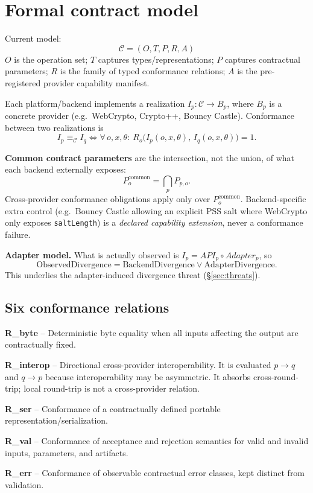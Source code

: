 \documentclass[11pt,a4paper]{article}
\begin{document}
\section{Formal contract model}
Current model:
\[\mathcal{C}=(O,T,P,R,A)\]
$O$ is the operation set; $T$ captures types/representations; $P$ captures contractual parameters; $R$ is the family of typed conformance relations; $A$ is the pre-registered provider capability manifest.

Each platform/backend implements a realization $I_p:\mathcal{C}\to B_p$, where $B_p$ is a concrete provider (e.g.\ WebCrypto, Crypto++, Bouncy Castle). Conformance between two realizations is
\[I_p\equiv_{\mathcal{C}} I_q \iff \forall\, o,x,\theta:\ R_o\big(I_p(o,x,\theta),\,I_q(o,x,\theta)\big)=1.\]

\textbf{Common contract parameters} are the intersection, not the union, of what each backend externally exposes:
\[P_o^{\text{common}} = \bigcap_p P_{p,o}.\]
Cross-provider conformance obligations apply only over $P_o^{\text{common}}$. Backend-specific extra control (e.g.\ Bouncy Castle allowing an explicit PSS salt where WebCrypto only exposes \texttt{saltLength}) is a \emph{declared capability extension}, never a conformance failure.

\textbf{Adapter model.} What is actually observed is $I_p = API_p \circ Adapter_p$, so
\[\text{ObservedDivergence} = \text{BackendDivergence} \lor \text{AdapterDivergence}.\]
This underlies the adapter-induced divergence threat (\S\ref{sec:threats}).

\subsection{Six conformance relations}
\textbf{R\_byte} -- Deterministic byte equality when all inputs affecting the output are contractually fixed.

\textbf{R\_interop} -- Directional cross-provider interoperability. It is evaluated $p\to q$ and $q\to p$ because interoperability may be asymmetric. It absorbs cross-round-trip; local round-trip is not a cross-provider relation.

\textbf{R\_ser} -- Conformance of a contractually defined portable representation/serialization.

\textbf{R\_val} -- Conformance of acceptance and rejection semantics for valid and invalid inputs, parameters, and artifacts.

\textbf{R\_err} -- Conformance of observable contractual error classes, kept distinct from validation.
\end{document}
